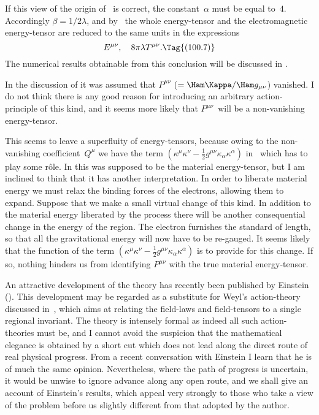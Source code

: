 \documentclass[12pt]{book}
\begin{document}
If this view of the origin of~ is correct, the constant~$\alpha$ must be
equal to~$4$. Accordingly $\beta = 1/2\lambda$, and by~ the whole energy-tensor
and the electromagnetic energy-tensor are reduced to the same units in the
expressions
\[
E^{\mu\nu},\quad
8\pi\lambda T^{\mu\nu}.
\Tag{(100.7)}
\]
The numerical results obtainable from this conclusion will be discussed in
.

In the discussion of  it was assumed that $P^{\mu\nu}$ ($= \Ham\Kappa/\Ham g_{\mu\nu}$) vanished.
I do not think there is any good reason for introducing an arbitrary action-principle
of this kind, and it seems more likely that $P^{\mu\nu}$~will be a non-vanishing
energy-tensor.

This seems to leave a superfluity of energy-tensors, because owing to the
non-vanishing coefficient~$Q^{\mu}$ we have the term $(\kappa^{\mu} \kappa^{\nu} - \frac{1}{2} g^{\mu\nu} \kappa_{\alpha} \kappa^{\alpha})$ in~
which has to play some rôle. In  this was supposed to be the material
energy-tensor, but I am inclined to think that it has another interpretation.
In order to liberate material energy we must relax the binding forces of the
electrons, allowing them to expand. Suppose that we make a small virtual
change of this kind. In addition to the material energy liberated by the
process there will be another consequential change in the energy of the
region. The electron furnishes the standard of length, so that all the gravitational
energy will now have to be re-gauged. It seems likely that the
function of the term $(\kappa^{\mu} \kappa^{\nu} - \frac{1}{2} g^{\mu\nu} \kappa_{\alpha} \kappa^{\alpha})$ is to provide for this change. If so,
nothing hinders us from identifying $P^{\mu\nu}$ with the true material energy-tensor.

An attractive development of the theory has recently been published by Einstein
().
 This development may be regarded as a substitute for Weyl's action\hyp{}theory
discussed in~, which aims at relating the field-laws and field\hyp{}tensors to a single regional invariant.
The theory is intensely formal as indeed all such action\hyp{}theories must be, and I cannot avoid the suspicion
that the mathematical elegance is obtained by a short cut which does not lead along the direct route of real physical
progress.
From a recent conversation with Einstein I learn that he is of much the same opinion.
Nevertheless, where the path of progress is uncertain, it would be unwise to ignore advance along any open route,
and we shall give an account of Einstein's results, which appeal very strongly to those who take a view of the
problem before us slightly different from that adopted by the author.
\end{document}
